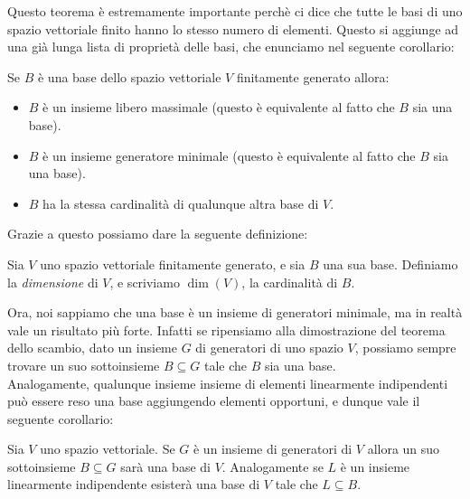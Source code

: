 \documentclass[11pt]{scrartcl}
\begin{document}
	Questo teorema è estremamente importante perchè ci dice che tutte le basi di uno spazio vettoriale finito hanno lo stesso numero di elementi. Questo si aggiunge ad una già lunga lista di proprietà delle basi, che enunciamo nel seguente corollario:
	\begin{corollary}
		Se $B$ è una base dello spazio vettoriale $V$ finitamente generato allora:
		\begin{itemize}
			\item $B$ è un insieme libero massimale (questo è equivalente al fatto che $B$ sia una base). 
			\item $B$ è un insieme generatore minimale (questo è equivalente al fatto che $B$ sia una base). 
			\item $B$ ha la stessa cardinalità di qualunque altra base di $V$.  
		\end{itemize}
	\end{corollary}
	Grazie a questo possiamo dare la seguente definizione:
	\begin{definition}
		Sia $V$ uno spazio vettoriale finitamente generato, e sia $B$ una sua base. Definiamo la \textit{dimensione} di $V$, e scriviamo $\dim(V)$, la cardinalità di $B$.
	\end{definition}
	Ora, noi sappiamo che una base è un insieme di generatori minimale, ma in realtà vale un risultato più forte. Infatti se ripensiamo alla dimostrazione del teorema dello scambio, dato un insieme $G$ di generatori di uno spazio $V$, possiamo sempre trovare un suo sottoinsieme $B\subseteq G$ tale che $B$ sia una base. \\
	Analogamente, qualunque insieme insieme di elementi linearmente indipendenti può essere reso una base aggiungendo elementi opportuni, e dunque vale il seguente corollario:
	\begin{corollary}\label{estensione di una base/riduzione di una base}
		Sia $V$ uno spazio vettoriale. Se $G$ è un insieme di generatori di $V$ allora un suo sottoinsieme $B\subseteq G$ sarà una base di $V$. Analogamente se $L$ è un insieme linearmente indipendente esisterà una base di $V$ tale che $L\subseteq B$.
	\end{corollary}
\end{document}
